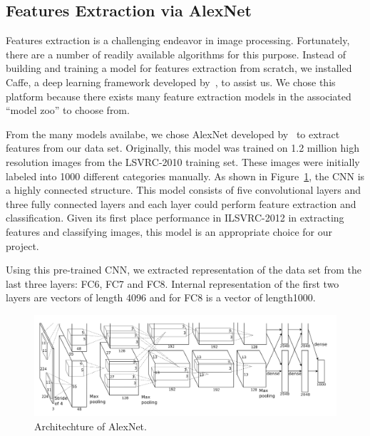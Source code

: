 \documentclass{article} %
\begin{document}
 
\subsection{Features Extraction via AlexNet}

Features extraction is a challenging endeavor in image processing. Fortunately, there are a number of readily available algorithms for this purpose. Instead of building and training a model for features extraction from scratch, we installed Caffe, a deep learning framework developed by~\citet{jia2014caffe}, to assist us. We chose this platform because there exists many feature extraction models in the associated ``model zoo'' to choose from. 

From the many models availabe, we chose AlexNet developed by~\citet{krizhevsky2012imagenet} to extract features from our data set. Originally, this model was trained on 1.2 million high resolution images from the LSVRC-2010 training set. These images were initially labeled into 1000 different categories manually. As shown in Figure~\ref{fig:alexnet}, the CNN is a highly connected structure. This model consists of five convolutional layers and three fully connected layers and each layer could perform feature extraction and classification. Given its first place performance in ILSVRC-2012 in extracting features and classifying images, this model is an appropriate choice for our project.  

Using this pre-trained CNN, we extracted representation of the data set from the last three layers: FC6, FC7 and FC8. Internal representation of the first two layers are vectors of length 4096 and for FC8 is a vector of length1000.
\begin{figure}[h]
\centering
\includegraphics[width=\textwidth]{alexnet.png}
\caption{Architechture of AlexNet.}
\label{fig:alexnet}
\end{figure}
\end{document}
